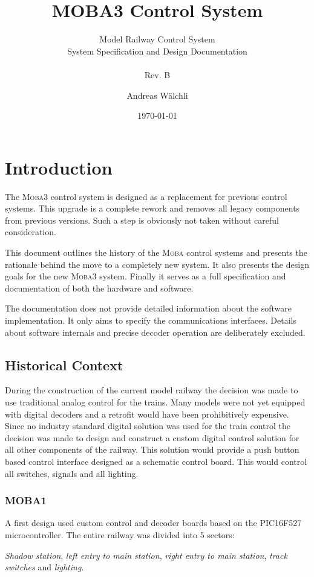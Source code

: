 \documentclass{scrreprt}
\title{MOBA3 Control System}
\subtitle{
Model Railway Control System\\
System Specification and Design Documentation\\\ \\
Rev. B}
\author{Andreas Wälchli}
\date{\today}
\begin{document}
\maketitle

\tableofcontents

\chapter{Introduction}
The \textsc{Moba3} control system is designed as a replacement for previous control systems.
This upgrade is a complete rework and removes all legacy components from previous versions.
Such a step is obviously not taken without careful consideration.

This document outlines the history of the \textsc{Moba} control systems and presents the rationale behind the move to a completely new system.
It also presents the design goals for the new \textsc{Moba3} system.
Finally it serves as a full specification and documentation of both the hardware and software.

The documentation does not provide detailed information about the software implementation.
It only aims to specify the communications interfaces.
Details about software internals and precise decoder operation are deliberately excluded.

\section{Historical Context}
During the construction of the current model railway the decision was made to use traditional analog control for the trains.
Many models were not yet equipped with digital decoders and a retrofit would have been prohibitively expensive.
Since no industry standard digital solution was used for the train control the decision was made to design and construct a custom digital control solution for all other components of the railway.
This solution would provide a push button based control interface designed as a schematic control board.
This would control all switches, signals and all lighting.

\subsection{MOBA1}
A first design used custom control and decoder boards based on the PIC16F527 microcontroller.
The entire railway was divided into 5 sectors:

\emph{Shadow station}, \emph{left entry to main station}, \emph{right entry to main station}, \emph{track switches} and \emph{lighting}.
\end{document}
